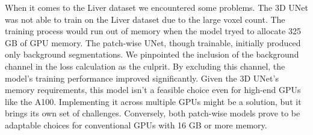 When it comes to the Liver dataset we encountered some problems. The 3D UNet was not able to train on the Liver dataset due to the large voxel count.
The training process would run out of memory when the model tryed to allocate 325 GB of GPU memory.
The patch-wise UNet, though trainable, initially produced only background segmentations.
We pinpointed the inclusion of the background channel in the loss calculation as the culprit. By excluding this channel,
the model's training performance improved significantly. Given the 3D UNet's memory requirements,
this model isn't a feasible choice even for high-end GPUs like the A100. Implementing it across multiple GPUs might be a solution, but it brings its own set of challenges.
Conversely, both patch-wise models prove to be adaptable choices for conventional GPUs with 16 GB or more memory.

